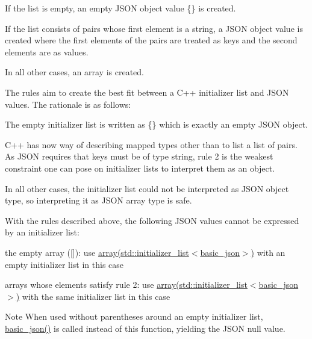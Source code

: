 \begin{DoxyEnumerate}
\item If the list is empty, an empty J\-S\-O\-N object value {\ttfamily \{\}} is created.
\item If the list consists of pairs whose first element is a string, a J\-S\-O\-N object value is created where the first elements of the pairs are treated as keys and the second elements are as values.
\item In all other cases, an array is created.
\end{DoxyEnumerate}

The rules aim to create the best fit between a C++ initializer list and J\-S\-O\-N values. The rationale is as follows\-:


\begin{DoxyEnumerate}
\item The empty initializer list is written as {\ttfamily \{\}} which is exactly an empty J\-S\-O\-N object.
\item C++ has now way of describing mapped types other than to list a list of pairs. As J\-S\-O\-N requires that keys must be of type string, rule 2 is the weakest constraint one can pose on initializer lists to interpret them as an object.
\item In all other cases, the initializer list could not be interpreted as J\-S\-O\-N object type, so interpreting it as J\-S\-O\-N array type is safe.
\end{DoxyEnumerate}

With the rules described above, the following J\-S\-O\-N values cannot be expressed by an initializer list\-:


\begin{DoxyItemize}
\item the empty array ({\ttfamily \mbox{[}\mbox{]}})\-: use \hyperlink{classnlohmann_1_1basic__json_a5685815624b086caa532f41e853d4b0f}{array(std\-::initializer\-\_\-list$<$basic\-\_\-json$>$)} with an empty initializer list in this case
\item arrays whose elements satisfy rule 2\-: use \hyperlink{classnlohmann_1_1basic__json_a5685815624b086caa532f41e853d4b0f}{array(std\-::initializer\-\_\-list$<$basic\-\_\-json$>$)} with the same initializer list in this case
\end{DoxyItemize}

\begin{DoxyNote}{Note}
When used without parentheses around an empty initializer list, \hyperlink{classnlohmann_1_1basic__json_a53771a7a4f2787125e55f64448f24ce6}{basic\-\_\-json()} is called instead of this function, yielding the J\-S\-O\-N null value.
\end{DoxyNote}

